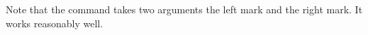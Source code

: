 
Note that the  command takes two arguments the left mark and the right mark. It works reasonably well.



